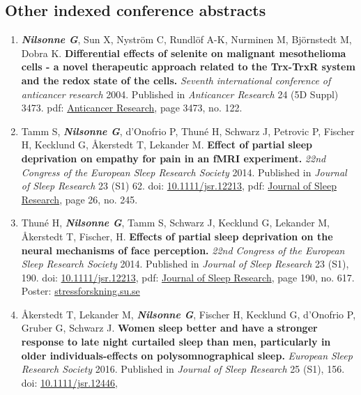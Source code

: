 \documentclass[10pt]{article}
\begin{document}
\subsection*{Other indexed conference abstracts}
\begin{enumerate}[nolistsep]
\item \textbf{\textit{Nilsonne G}}, Sun X, Nyström C, Rundlöf A-K, Nurminen M, Björnstedt M, Dobra K. \textbf{Differential effects of selenite on malignant mesothelioma cells - a novel therapeutic approach related to the Trx-TrxR system and the redox state of the cells.} \emph{Seventh international conference of anticancer research} 2004. Published in \emph{Anticancer Research} 24 (5D Suppl) 3473.
pdf: \href{http://ar.iiarjournals.org/content/24/5D_Suppl/3415.full.pdf+html}{Anticancer Research}, page 3473, no. 122.
\item Tamm S, \textbf{\textit{Nilsonne G}}, d'Onofrio P, Thuné H, Schwarz J, Petrovic P, Fischer H, Kecklund G, Åkerstedt T, Lekander M. \textbf{Effect of partial sleep deprivation on empathy for pain in an fMRI experiment.} \emph{22nd Congress of the European Sleep Research Society} 2014. Published in \emph{Journal of Sleep Research} 23 (S1) 62.
doi: \href{http://dx.doi.org/10.1111/jsr.12213}{10.1111/jsr.12213},
pdf: \href{http://onlinelibrary.wiley.com/doi/10.1111/jsr.12213/epdf}{Journal of Sleep Research}, page 26, no. 245.
\item Thuné H, \textbf{\textit{Nilsonne G}}, Tamm S, Schwarz J, Kecklund G, Lekander M, Åkerstedt T, Fischer, H. \textbf{Effects of partial sleep deprivation on the neural mechanisms of face perception.} \emph{22nd Congress of the European Sleep Research Society} 2014. Published in \emph{Journal of Sleep Research} 23 (S1), 190.
doi: \href{http://dx.doi.org/10.1111/jsr.12213}{10.1111/jsr.12213},
pdf: \href{http://onlinelibrary.wiley.com/doi/10.1111/jsr.12213/epdf}{Journal of Sleep Research}, page 190, no. 617.
Poster: \href{http://www.stressforskning.su.se/polopoly_fs/1.238728.1433421508!/menu/standard/file/hanna.pdf}{stressforskning.su.se}
\item Åkerstedt T, Lekander M, \textbf{\textit{Nilsonne G}}, Fischer H, Kecklund G, d'Onofrio P, Gruber G, Schwarz J. \textbf{Women sleep better and have a stronger response to late night curtailed sleep than men, particularly in older individuals-effects on polysomnographical sleep.} \emph{European Sleep Research Society} 2016. Published in \emph{Journal of Sleep Research} 25 (S1), 156.
doi: \href{http:/doi.org/10.1111/jsr.12446}{10.1111/jsr.12446}, 

\end{enumerate}
\end{document}
